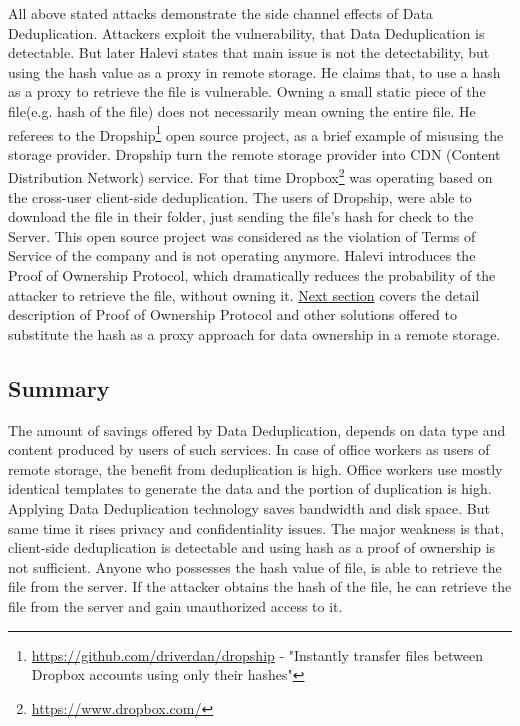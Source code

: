 \documentclass[12pt]{article}
\begin{document}
All above stated attacks demonstrate the side channel effects of Data Deduplication. Attackers exploit the vulnerability, that Data Deduplication is detectable. But later Halevi states that main issue is not the detectability, but using the hash value as a proxy in remote storage.\cite{PoW} He claims that, to use a hash as a proxy to retrieve the file is vulnerable. Owning a small static piece of the file(e.g. hash of the file) does not necessarily mean owning the entire file. He referees to the Dropship\footnote{\url{https://github.com/driverdan/dropship} - "Instantly transfer files between Dropbox accounts using only their hashes"} open source project, as a brief example of misusing the storage provider. Dropship turn the remote storage  provider into CDN (Content Distribution Network) service. For that time Dropbox\footnote{\url{https://www.dropbox.com/}} was operating based on the cross-user client-side deduplication. The users of Dropship, were able to download the file in their folder, just sending the file’s hash for check to the Server. This open source project was considered as the violation of Terms of Service of the company and is not operating anymore. Halevi introduces the Proof of Ownership Protocol, which dramatically reduces the probability of the attacker to retrieve the file, without owning it. \hyperref[sec:4]{Next section} covers the detail description of Proof of Ownership Protocol and other solutions offered to substitute the hash as a proxy approach for data ownership in a remote storage.\cite{PoW}

\subsection{Summary}
\label{subsub:AttackSummary}
The amount of savings offered by Data Deduplication, depends on data type and content produced by users of such services.\cite{ratio}  In case of office workers as users of remote storage, the benefit from deduplication is high. Office workers use mostly identical templates to generate the data and the portion of duplication is high. Applying Data Deduplication technology saves bandwidth and disk space.  But same time it rises privacy and confidentiality issues. The major weakness is that, client-side deduplication is detectable and using hash as a proof of ownership is not sufficient. Anyone who possesses the hash value of file, is able to retrieve the file from the server.  If the attacker  obtains the hash of the file, he can retrieve the file from the server and gain unauthorized access to it.
\pagebreak
\end{document}
